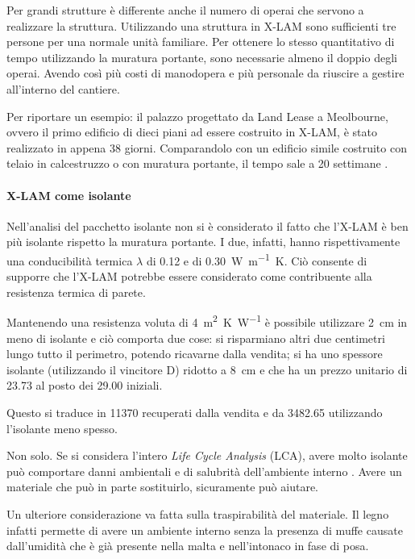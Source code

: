 Per grandi strutture è differente anche il numero di operai che servono a realizzare la struttura. Utilizzando una struttura in X-LAM sono sufficienti tre persone per una normale unità familiare. Per ottenere lo stesso quantitativo di tempo utilizzando la muratura portante, sono necessarie almeno il doppio degli operai. Avendo così più costi di manodopera e più personale da riuscire a gestire all'interno del cantiere. 

Per riportare un esempio: il palazzo progettato da Land Lease a Meolbourne, ovvero il primo edificio di dieci piani ad essere costruito in X-LAM, è stato realizzato in appena 38 giorni. Comparandolo con un edificio simile costruito con telaio in calcestruzzo o con muratura portante, il tempo sale a 20 settimane \cite[39]{10storey}. 


\paragraph{X-LAM come isolante}
Nell'analisi del pacchetto isolante non si è considerato il fatto che l'X-LAM è ben più isolante rispetto la muratura portante. I due, infatti, hanno rispettivamente una conducibilità termica $\lambda$ di \SI{0.12}{} e di \SI{0.30}{W\per\metre K}.
Ciò consente di supporre che l'X-LAM potrebbe essere considerato come contribuente alla resistenza termica di parete. 

Mantenendo una resistenza voluta di \SI{4}{\square\metre K\per W} è possibile utilizzare \SI{2}{\centi\metre} in meno di isolante e ciò comporta due cose: si risparmiano altri due centimetri lungo tutto il perimetro, potendo ricavarne dalla vendita; si ha uno spessore isolante (utilizzando il vincitore D) ridotto a \SI{8}{\centi\metre} e che ha un prezzo unitario di \SI{23.73}{\teuro} al posto dei \SI{29.00}{\teuro} iniziali.

Questo si traduce in \SI{11370}{\teuro} recuperati dalla vendita e da \SI{3482.65}{\teuro} utilizzando l'isolante meno spesso.

Non solo. 
Se si considera l'intero \textit{Life Cycle Analysis} (LCA), avere molto isolante può comportare danni ambientali e di salubrità dell'ambiente interno \cite{reijnders_comprehensiveness_1999}. 
Avere un materiale che può in parte sostituirlo, sicuramente può aiutare. 

Un ulteriore considerazione va fatta sulla traspirabilità del materiale. 
Il legno infatti permette di avere un ambiente interno senza la presenza di muffe causate dall'umidità che è già presente nella malta e nell'intonaco in fase di posa.
